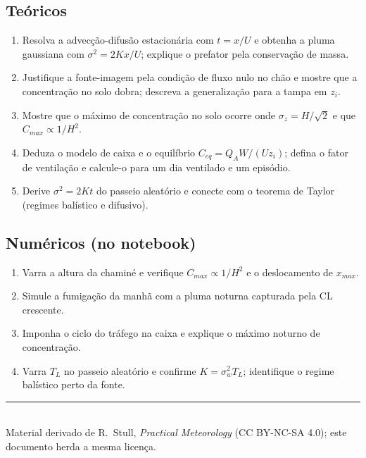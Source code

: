 \documentclass[11pt]{article}
\begin{document}
\subsection*{Teóricos}

\begin{enumerate}[label=\textbf{T\arabic*.},itemsep=4pt]
  \item Resolva a advecção-difusão estacionária com $t = x/U$ e
        obtenha a pluma gaussiana com
        $\sigma^2 = 2Kx/U$; explique o prefator pela conservação de
        massa.
  \item Justifique a fonte-imagem pela condição de fluxo nulo no chão
        e mostre que a concentração no solo dobra; descreva a
        generalização para a tampa em $z_i$.
  \item Mostre que o máximo de concentração no solo ocorre onde
        $\sigma_z = H/\sqrt2$ e que $C_{max} \propto 1/H^2$.
  \item Deduza o modelo de caixa e o equilíbrio
        $C_{eq} = Q_AW/(Uz_i)$; defina o fator de ventilação e
        calcule-o para um dia ventilado e um episódio.
  \item Derive $\sigma^2 = 2Kt$ do passeio aleatório e conecte com o
        teorema de Taylor (regimes balístico e difusivo).
\end{enumerate}

\subsection*{Numéricos (no notebook)}

\begin{enumerate}[label=\textbf{N\arabic*.},itemsep=4pt]
  \item Varra a altura da chaminé e verifique
        $C_{max}\propto 1/H^2$ e o deslocamento de $x_{max}$.
  \item Simule a fumigação da manhã com a pluma noturna capturada
        pela CL crescente.
  \item Imponha o ciclo do tráfego na caixa e explique o máximo
        noturno de concentração.
  \item Varra $T_L$ no passeio aleatório e confirme
        $K = \sigma_w^2T_L$; identifique o regime balístico perto da
        fonte.
\end{enumerate}

\vspace{1em}
\noindent\rule{\linewidth}{0.4pt}\\
{\scriptsize Material derivado de R.~Stull, \emph{Practical Meteorology}
(CC BY-NC-SA 4.0); este documento herda a mesma licença.}
\end{document}
